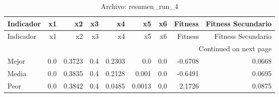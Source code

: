 \begin{longtable}{lrrrrrrrr}
\caption{Archivo: resumen\_run\_4}\label{tab:resumen_run_4} \\
\toprule
Indicador & x1 & x2 & x3 & x4 & x5 & x6 & Fitness & Fitness Secundario \\
\midrule
\endfirsthead
\toprule
Indicador & x1 & x2 & x3 & x4 & x5 & x6 & Fitness & Fitness Secundario \\
\midrule
\endhead
\midrule
\multicolumn{9}{r}{Continued on next page} \\
\midrule
\endfoot
\bottomrule
\endlastfoot
Mejor & 0.0 & 0.3723 & 0.4 & 0.2303 & 0.0 & 0.0 & -0.6708 & 0.0668 \\
Media & 0.0 & 0.3835 & 0.4 & 0.2128 & 0.001 & 0.0 & -0.6491 & 0.0695 \\
Peor & 0.0 & 0.3842 & 0.4 & 0.0485 & 0.0013 & 0.0 & 2.1726 & 0.0875 \\
\end{longtable}